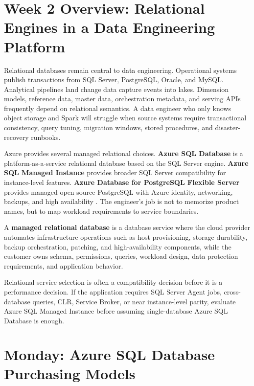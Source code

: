 \section{Week 2 Overview: Relational Engines in a Data Engineering Platform}
Relational databases remain central to data engineering. Operational systems publish transactions from SQL Server, PostgreSQL, Oracle, and MySQL. Analytical pipelines land change data capture events into lakes. Dimension models, reference data, master data, orchestration metadata, and serving APIs frequently depend on relational semantics. A data engineer who only knows object storage and Spark will struggle when source systems require transactional consistency, query tuning, migration windows, stored procedures, and disaster-recovery runbooks.

Azure provides several managed relational choices. \textbf{Azure SQL Database} is a platform-as-a-service relational database based on the SQL Server engine. \textbf{Azure SQL Managed Instance} provides broader SQL Server compatibility for instance-level features. \textbf{Azure Database for PostgreSQL Flexible Server} provides managed open-source PostgreSQL with Azure identity, networking, backups, and high availability \cite{microsoft2025azuresqldb,microsoft2025postgresflexible}. The engineer's job is not to memorize product names, but to map workload requirements to service boundaries.

\begin{definitionbox}
A \textbf{managed relational database} is a database service where the cloud provider automates infrastructure operations such as host provisioning, storage durability, backup orchestration, patching, and high-availability components, while the customer owns schema, permissions, queries, workload design, data protection requirements, and application behavior.
\end{definitionbox}

\begin{notebox}
Relational service selection is often a compatibility decision before it is a performance decision. If the application requires SQL Server Agent jobs, cross-database queries, CLR, Service Broker, or near instance-level parity, evaluate Azure SQL Managed Instance before assuming single-database Azure SQL Database is enough.
\end{notebox}

\section{Monday: Azure SQL Database Purchasing Models}

